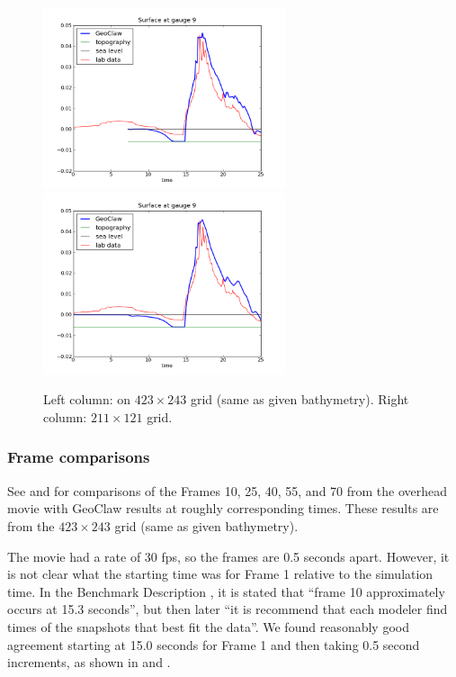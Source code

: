 \begin{figure}[ht]
\vskip 5pt
\hfil\includegraphics[width=2.8in]{bp7/figs423/gauge0009fig300.png}\hfil
\hfil\includegraphics[width=2.8in]{bp7/figs211/gauge0009fig300.png}\hfil
\caption{\label{fig:bp7gauges} 
Left column: on $423\times 243$ grid (same as given bathymetry).
Right column: $211\times 121$ grid.
  }
\end{figure}



\subsubsection{Frame comparisons}

See  and  for comparisons of the Frames 10,
25, 40, 55, and 70 from the overhead movie with GeoClaw results at roughly
corresponding times.  These results are from the $423\times 243$ grid (same
as given bathymetry).

The movie had a rate of 30 fps, so the frames are 0.5 seconds apart. However,
it is not clear what the starting time was for Frame 1 relative to the
simulation time.   In the Benchmark Description \cite{bp-description}, it is
stated that ``frame 10 approximately occurs at 15.3 seconds'', but then later
``it is recommend that each modeler find times of the snapshots that best fit
the data''.   We found reasonably good agreement starting at 15.0 seconds for
Frame 1 and then taking 0.5 second increments, as shown in 
and .

